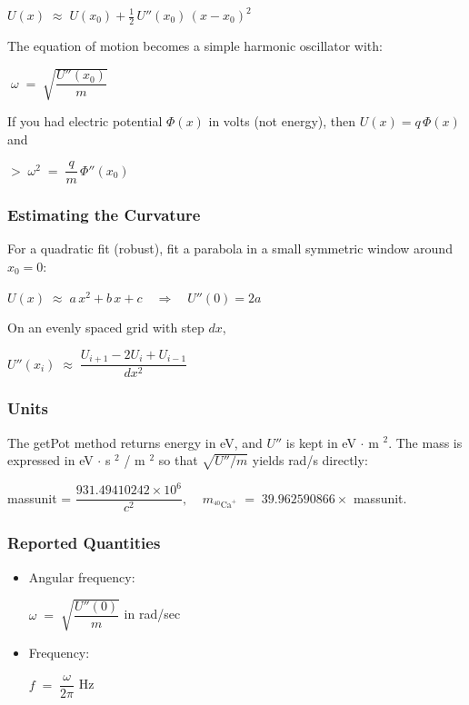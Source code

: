 \documentclass[11pt, a4paper]{article}
\theoremstyle{definition}
\numberwithin{equation}{section}
\begin{document}
\begin{center}
    $ U(x)\;\approx\;U(x_0)+\tfrac12\,U''(x_0)\,(x-x_0)^2 $
\end{center}

The equation of motion becomes a simple harmonic oscillator with:

\begin{center}
    $ \;\omega \;=\; \sqrt{\dfrac{U''(x_0)}{m}}\; $
\end{center}

If you had electric potential $\Phi(x)$ in volts (not energy), then $U(x)=q\,\Phi(x)$ and
\begin{center}
    $ > \;\omega^2 \;=\; \dfrac{q}{m}\,\Phi''(x_0)\; $
\end{center}

\subsubsection{Estimating the Curvature}

For a quadratic fit (robust), fit a parabola in a small symmetric window around $x_0=0$:

\begin{center}
    $ U(x)\;\approx\; a\,x^2 + b\,x + c\quad \Longrightarrow \quad U''(0) = 2a $
\end{center}

On an evenly spaced grid with step \(dx\),
\begin{center}
    $ U''(x_i)\;\approx\;\dfrac{U_{i+1}-2U_i+U_{i-1}}{dx^2} $
\end{center}

\subsubsection{Units}
The getPot method returns energy in eV, and $U''$ is kept in eV $\cdot$ m $^2$.
The mass is expressed in eV $\cdot$ s $^2$ / m $^2$ so that $\sqrt{U''/m}$ yields rad/s directly:
\begin{center}
    massunit = $\dfrac{931.49410242\times 10^6}{c^2}, \; \; \; \; m_{^{40} \mathrm{Ca}^+} \;=\; 39.962590866 \times $ massunit.
\end{center}

\subsubsection{Reported Quantities}
\begin{itemize}
    \item Angular frequency:
    \begin{center}
        $ \omega \;=\; \sqrt{\dfrac{U''(0)}{m}}$ in rad/sec
    \end{center}

    \item Frequency:
    \begin{center}
        $f \;=\; \dfrac{\omega}{2\pi} $ Hz
    \end{center}
\end{itemize}
\end{document}
